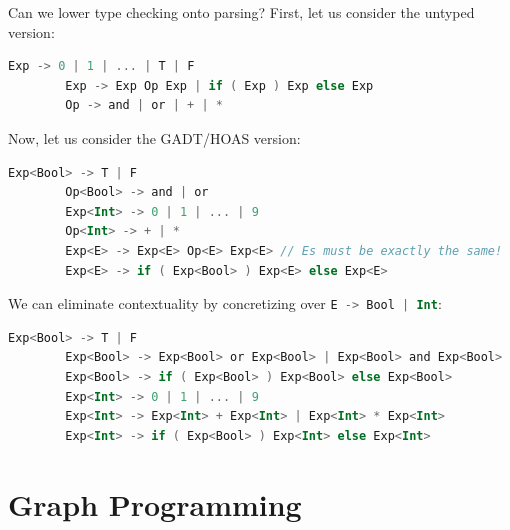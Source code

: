 \documentclass{beamer}
\begin{document}
    \begin{frame}[fragile]{Can we lower type checking onto parsing?}
        First, let us consider the untyped version:
        \begin{lstlisting}[language=Kotlin, gobble=5]
        Exp -> 0 | 1 | ... | T | F
        Exp -> Exp Op Exp | if ( Exp ) Exp else Exp
        Op -> and | or | + | *
        \end{lstlisting}
        Now, let us consider the GADT/HOAS version:
        \begin{lstlisting}[language=Kotlin, gobble=5]
        Exp<Bool> -> T | F
        Op<Bool> -> and | or
        Exp<Int> -> 0 | 1 | ... | 9
        Op<Int> -> + | *
        Exp<E> -> Exp<E> Op<E> Exp<E> // Es must be exactly the same!
        Exp<E> -> if ( Exp<Bool> ) Exp<E> else Exp<E>
        \end{lstlisting}
        We can eliminate contextuality by concretizing over \lstinline[language=Kotlin]{E -> Bool | Int}:
        \begin{lstlisting}[language=Kotlin, gobble=5]
        Exp<Bool> -> T | F
        Exp<Bool> -> Exp<Bool> or Exp<Bool> | Exp<Bool> and Exp<Bool>
        Exp<Bool> -> if ( Exp<Bool> ) Exp<Bool> else Exp<Bool>
        Exp<Int> -> 0 | 1 | ... | 9
        Exp<Int> -> Exp<Int> + Exp<Int> | Exp<Int> * Exp<Int>
        Exp<Int> -> if ( Exp<Bool> ) Exp<Int> else Exp<Int>
        \end{lstlisting}
    \end{frame}

    \section{Graph Programming}
\end{document}
